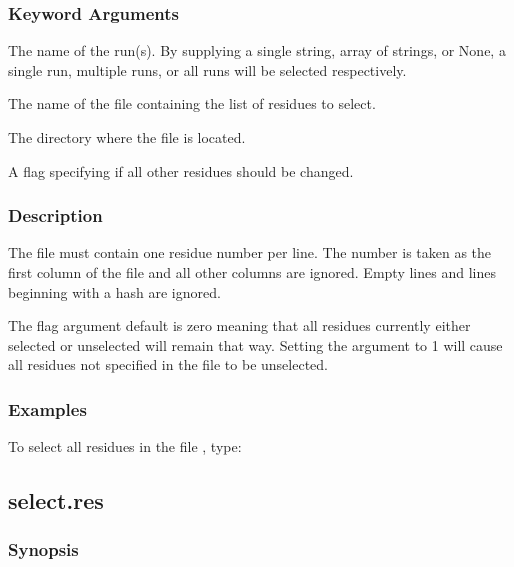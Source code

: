   
 \subsubsection{Keyword Arguments} 

   The name of the run(s).  By supplying a single string, array of strings, or None, a single run, multiple runs, or all runs will be selected respectively.   

   The name of the file containing the list of residues to select.   

   The directory where the file is located.   

   A flag specifying if all other residues should be changed.  

  

  
 \subsubsection{Description} 

 The file must contain one residue number per line.  The number is taken as the first column of the file and all other columns are ignored.  Empty lines and lines beginning with a hash are ignored. 
  

 The  flag argument default is zero meaning that all residues currently either selected or unselected will remain that way.  Setting the argument to 1 will cause all residues not specified in the file to be unselected. 
  

  
 \subsubsection{Examples} 

 To select all residues in the file , type: 
  



  

 \newpage 

 \subsection{select.res} 

  
 \subsubsection{Synopsis} 

